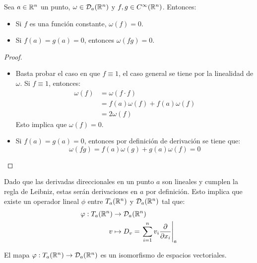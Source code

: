 \begin{lemma}\label{Lemma: Propiedades de las Derivaciones}
	Sea $a \in \mathbb{R}^n$ un punto, $\omega \in \mathcal{D}_a(\mathbb{R}^n)$ y $f,g \in C^{\infty}(\mathbb{R}^n)$. Entonces:
	\begin{itemize}
		\item Si $f$ es una función constante, $\omega(f) = 0$.
		\item Si $f(a) = g(a) = 0$, entonces $\omega(fg) = 0$.
	\end{itemize}
\end{lemma}

\begin{proof}
	\begin{itemize}
		\item Basta probar el caso en que $f \equiv 1$, el caso general se tiene por la linealidad de $\omega$. Si $f \equiv 1$, entonces:
		      \begin{align*}
			      \omega(f) & = \omega(f \cdot f)             \\
			                & = f(a)\omega(f) + f(a)\omega(f) \\
			                & = 2\omega(f)
		      \end{align*}
		      Esto implica que $\omega(f) = 0$.
		\item Si $f(a) = g(a) = 0$, entonces por definición de derivación se tiene que:
		      \[ \omega(fg)= f(a)\omega(g) + g(a)\omega(f) = 0  \]
	\end{itemize}
\end{proof}

Dado que las derivadas direccionales en un punto $a$ son lineales y cumplen la regla de Leibniz, estas serán derivaciones en $a$ por definición. Esto implica que existe un operador lineal $\phi$ entre $T_a(\mathbb{R}^n)$ y $\mathcal{D}_a(\mathbb{R}^n)$ tal que:
\begin{align*}
	\varphi: T_a(\mathbb{R}^n) & \to \mathcal{D}_a(\mathbb{R}^n) \\
	v               & \mapsto D_v =
	\left. \sum_{i=1}^{n} v_i \frac{\partial}{\partial x_i} \right|_a
\end{align*}

\begin{theorem}\label{Teorema: Isomorfismo entre Espacio Tangente y Espacio de Derivaciones}
	El mapa $\varphi: T_a(\mathbb{R}^n) \to \mathcal{D}_a(\mathbb{R}^n)$ es un isomorfismo de espacios vectoriales.
\end{theorem}

